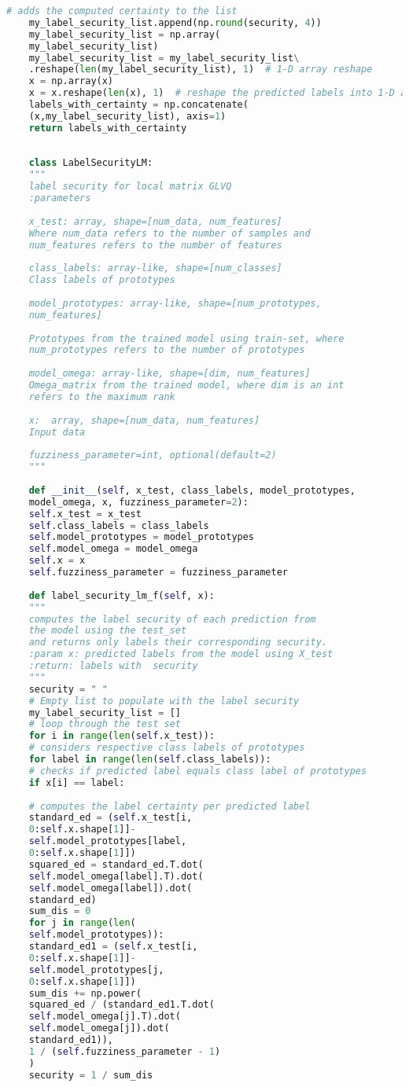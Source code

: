 \begin{lstlisting}[caption=label\textunderscore security1.py ,style=chstyle, language=Python]
	# adds the computed certainty to the list
	my_label_security_list.append(np.round(security, 4))
	my_label_security_list = np.array(
	my_label_security_list)
	my_label_security_list = my_label_security_list\
	.reshape(len(my_label_security_list), 1)  # 1-D array reshape
	x = np.array(x)
	x = x.reshape(len(x), 1)  # reshape the predicted labels into 1-D array
	labels_with_certainty = np.concatenate(
	(x,my_label_security_list), axis=1)
	return labels_with_certainty
	
	
	class LabelSecurityLM:
	"""
	label security for local matrix GLVQ
	:parameters
	
	x_test: array, shape=[num_data, num_features]
	Where num_data refers to the number of samples and 
	num_features refers to the number of features
	
	class_labels: array-like, shape=[num_classes]
	Class labels of prototypes
	
	model_prototypes: array-like, shape=[num_prototypes,
	num_features]
	
	Prototypes from the trained model using train-set, where
	num_prototypes refers to the number of prototypes
	
	model_omega: array-like, shape=[dim, num_features]
	Omega_matrix from the trained model, where dim is an int 
	refers to the maximum rank
	
	x:  array, shape=[num_data, num_features]
	Input data
	
	fuzziness_parameter=int, optional(default=2)
	"""
	
	def __init__(self, x_test, class_labels, model_prototypes,
	model_omega, x, fuzziness_parameter=2):
	self.x_test = x_test
	self.class_labels = class_labels
	self.model_prototypes = model_prototypes
	self.model_omega = model_omega
	self.x = x
	self.fuzziness_parameter = fuzziness_parameter
	
	def label_security_lm_f(self, x):
	"""
	computes the label security of each prediction from
	the model using the test_set
	and returns only labels their corresponding security.
	:param x: predicted labels from the model using X_test
	:return: labels with  security
	"""
	security = " "
	# Empty list to populate with the label security
	my_label_security_list = []
	# loop through the test set
	for i in range(len(self.x_test)):
	# considers respective class labels of prototypes
	for label in range(len(self.class_labels)):
	# checks if predicted label equals class label of prototypes
	if x[i] == label:
	
	# computes the label certainty per predicted label
	standard_ed = (self.x_test[i,
	0:self.x.shape[1]]-
	self.model_prototypes[label,
	0:self.x.shape[1]])
	squared_ed = standard_ed.T.dot(
	self.model_omega[label].T).dot(
	self.model_omega[label]).dot(
	standard_ed)
	sum_dis = 0
	for j in range(len(
	self.model_prototypes)):
	standard_ed1 = (self.x_test[i,
	0:self.x.shape[1]]-
	self.model_prototypes[j,
	0:self.x.shape[1]])
	sum_dis += np.power(
	squared_ed / (standard_ed1.T.dot(
	self.model_omega[j].T).dot(
	self.model_omega[j]).dot(
	standard_ed1)),
	1 / (self.fuzziness_parameter - 1)
	)
	security = 1 / sum_dis
	

\end{lstlisting}

